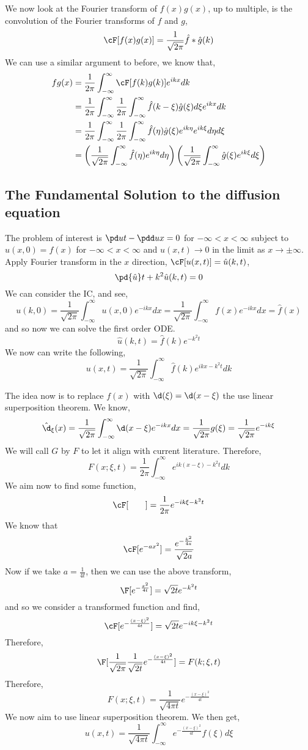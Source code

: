 \noindent
We now look at the Fourier transform of $f(x)g(x)$, up to multiple, is the convolution of the Fourier transforms of $f$ and $g$,
$$ \cF[f(x)g(x)] = \frac{1}{\sqrt{2\pi}} \hat f * \hat g(k) $$
We can use a similar argument to before, we know that,
\begin{align*}
  fg(x) &= \frac{1}{2\pi}\int_{-\infty}^\infty \cF[f(k)g(k)] e^{ikx}dk \\
  &= \frac{1}{2\pi}\int_{-\infty}^\infty  \frac{1}{2\pi} \int_{-\infty}^\infty \hat f(k - \xi) \hat g(\xi)d\xi e^{ikx}dk \\
  &= \frac{1}{2\pi}\int_{-\infty}^\infty  \frac{1}{2\pi} \int_{-\infty}^\infty \hat f(\eta)\hat g(\xi) e^{ik\eta}e^{ik\xi}d\eta d\xi \\
  &= \left(\frac{1}{\sqrt{2\pi}} \int_{-\infty}^\infty \hat f(\eta) e^{ik\eta} d\eta \right)\left(\frac{1}{\sqrt{2\pi}} \int_{-\infty}^\infty \hat g(\xi) e^{ik\xi} d\xi \right)
\end{align*}

\subsection{The Fundamental Solution to the diffusion equation}
The problem of interest is $\pd u t - \pdd u x = 0$ for $-\infty < x < \infty$ subject to $u(x, 0) = f(x)$ for $-\infty < x < \infty$ and $u(x, t) \to 0$ in the limit as $x \to \pm \infty$. Apply Fourier transform in the $x$ direction, $\cF [u(x, t)] = \hat u(k, t)$,
$$ \pd {\hat u} t + k^2 \hat u(k, t) = 0 $$
We can consider the IC, and see,
$$ u(k, 0) = \frac{1}{\sqrt{2\pi}}\int_{-\infty}^\infty u(x, 0)e^{-ikx}dx = \frac{1}{\sqrt{2\pi}}\int_{-\infty}^\infty f(x)e^{-ikx}dx = \hat f(x) $$
and so now we can solve the first order ODE.
$$ \hat u(k, t) = \hat f(k)e^{-k^2t} $$
We now can write the following,
$$ u(x, t) = \frac{1}{\sqrt{2\pi}}\int_{-\infty}^\infty \hat f(k)e^{ikx-k^2t}dk $$

\noindent
The idea now is to replace $f(x)$ with $\d(\xi) = \d(x - \xi)$ the use linear superposition theorem. We know,
$$ \hat \d_\xi(x) = \frac{1}{\sqrt{2\pi}}\int_{-\infty}^\infty \d(x - \xi)e^{-ikx}dx = \frac{1}{\sqrt{2\pi}}g(\xi) = \frac{1}{\sqrt{2\pi}}e^{-ik\xi} $$
We will call $G$ by $F$ to let it align with current literature. Therefore,
$$ F(x; \xi, t) = \frac{1}{2\pi}\int_{-\infty}^\infty e^{ik(x - \xi) - k^2t}dk $$
We aim now to find some function,
$$ \cF[ \qquad ] = \frac{1}{2\pi} e^{-ik\xi - k^2t} $$
We know that
$$ \cF [ e^{-ax^2} ] = \frac{e^{-\frac{k^2}{4a}}}{\sqrt{2a}}$$
Now if we take $a = \frac{1}{4t}$, then we can use the above transform,
$$ \F[ e^{-\frac{x^2}{4t}}] = \sqrt{2t}e^{-k^2t} $$
and so we consider a transformed function and find,
$$ \cF[e^{-\frac{(x - \xi)^2}{4t}}] = \sqrt{2t}e^{-ik\xi - k^2t} $$
Therefore,
$$ \F [ \frac{1}{\sqrt{2\pi}} \frac{1}{\sqrt{2t}} e^{-\frac{(x - \xi)^2}{4t}}] = F(k; \xi, t) $$
Therefore,
$$ F(x; \xi, t) = \frac{1}{\sqrt{4\pi t}} e^{-\frac{(x - \xi)^2}{4t}} $$
We now aim to use linear superposition theorem. We then get,
$$ u(x, t) = \frac{1}{\sqrt{4\pi t}}\int_{-\infty}^\infty e^{-\frac{(x - \xi)^2}{4t}}f(\xi)d\xi $$

